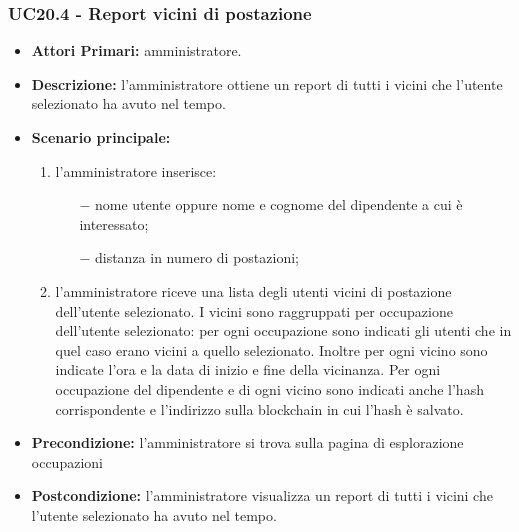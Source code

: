 \subsubsection{ UC20.4 - Report vicini di postazione}
\begin{itemize}
	\item\textbf{Attori Primari:} 
	amministratore.
	\item\textbf{Descrizione:} 
	l'amministratore ottiene un report di tutti i vicini che l'utente selezionato ha avuto nel tempo.
	\item\textbf{Scenario principale:} 
	\begin{enumerate}
		\item l'amministratore inserisce:
		\begin{itemize}
			\item[$-$] nome utente oppure nome e cognome del dipendente a cui è interessato;
			\item[$-$] distanza in numero di postazioni;
		\end{itemize}
		\item l'amministratore riceve una lista degli utenti vicini di postazione dell'utente selezionato. I vicini sono raggruppati per occupazione dell'utente selezionato: per ogni occupazione sono indicati gli utenti che in quel caso erano vicini a quello selezionato. Inoltre per ogni vicino sono indicate l'ora e la data di inizio e fine della vicinanza. Per ogni occupazione del dipendente e di ogni vicino sono indicati anche l'hash corrispondente e l'indirizzo sulla blockchain in cui l'hash è salvato.
	\end{enumerate}
	\item\textbf{Precondizione:} 
	l'amministratore si trova sulla pagina di esplorazione occupazioni
	\item\textbf{Postcondizione:}
	l'amministratore visualizza un report di tutti i vicini che l'utente selezionato ha avuto nel tempo.
\end{itemize}

